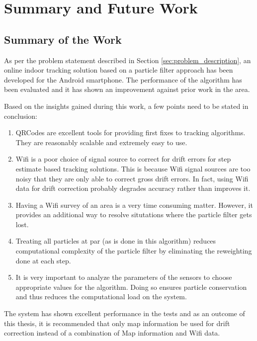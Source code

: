 \chapter{Summary and Future Work\label{chap:summary}}

\section{Summary of the Work}

As per the problem statement described in Section \ref{sec:problem_description},
an online indoor tracking solution based on a particle filter approach 
has been developed for the Android smartphone. The performance of the algorithm 
has been evaluated and it has shown an improvement against prior work in the 
area.

Based on the insights gained during this work, a few points need to be stated
in conclusion:

\begin{enumerate}
\item QRCodes are excellent tools for providing first fixes to tracking algorithms. They are reasonably scalable
    and extremely easy to use.
\item Wifi is a poor choice of signal source to correct for drift errors for step estimate based tracking solutions. This is because Wifi signal sources are too noisy that they are only able to correct gross drift errors. In fact, using Wifi data for drift correction probably degrades accuracy rather than improves it. 
\item Having a Wifi survey of an area is a very time consuming matter. However, it provides an additional way to resolve situtations where the particle filter gets lost. 
\item Treating all particles at par (as is done in this algorithm) reduces computational complexity of the particle filter by eliminating the reweighting done at each step.
\item It is very important to analyze the parameters of the sensors to choose appropriate values for the algorithm. Doing so ensures particle conservation and thus reduces the computational load on the system.
\end{enumerate}

The system has shown excellent performance in the tests and as an outcome of this thesis, it is recommended that only map information be used for drift correction instead of a combination of Map information and Wifi data. 


